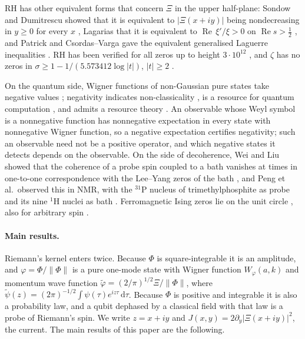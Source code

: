 \documentclass[11pt]{article}
\theoremstyle{definition}\newtheorem{definition}[theorem]{Definition}
\theoremstyle{remark}\newtheorem{remark}[theorem]{Remark}
\newcommand{\dd}{\,\mathrm d}\newcommand{\e}{\mathrm e}
\renewcommand{\Re}{\operatorname{Re}}\renewcommand{\Im}{\operatorname{Im}}
\begin{document}
RH has other equivalent forms that concern $\Xi$ in the upper half-plane: Sondow and Dumitrescu showed that it is equivalent to $|\Xi(x+iy)|$ being nondecreasing in $y\ge0$ for every $x$ \cite{SD}, Lagarias that it is equivalent to $\Re\,\xi'/\xi>0$ on $\Re s>\frac12$ \cite{Lagarias}, and Patrick and Csordas--Varga gave the equivalent generalised Laguerre inequalities \cite{Patrick,CV}. RH has been verified for all zeros up to height $3\cdot10^{12}$ \cite{PT}, and $\zeta$ has no zeros in $\sigma\ge1-1/(5.573412\log|t|)$, $|t|\ge2$ \cite{MT}.

On the quantum side, Wigner functions of non-Gaussian pure states take negative values \cite{Hudson}; negativity indicates non-classicality \cite{KZ}, is a resource for quantum computation \cite{ME}, and admits a resource theory \cite{Albarelli}. An observable whose Weyl symbol is a nonnegative function has nonnegative expectation in every state with nonnegative Wigner function, so a negative expectation certifies negativity; such an observable need not be a positive operator, and which negative states it detects depends on the observable. On the side of decoherence, Wei and Liu showed that the coherence of a probe spin coupled to a bath vanishes at times in one-to-one correspondence with the Lee--Yang zeros of the bath \cite{WeiLiu}, and Peng et al.\ observed this in NMR, with the $^{31}$P nucleus of trimethylphosphite as probe and its nine $^1$H nuclei as bath \cite{Peng}. Ferromagnetic Ising zeros lie on the unit circle \cite{LeeYang}, also for arbitrary spin \cite{Griffiths69}.

\paragraph{Main results.} Riemann's kernel enters twice. Because $\Phi$ is square-integrable it is an amplitude, and $\varphi=\Phi/\|\Phi\|$ is a pure one-mode state with Wigner function $W_\varphi(a,k)$ and momentum wave function $\tilde\varphi=(2/\pi)^{1/2}\Xi/\|\Phi\|$, where $\tilde\psi(z)=(2\pi)^{-1/2}\int\psi(\tau)e^{iz\tau}\dd\tau$. Because $\Phi$ is positive and integrable it is also a probability law, and a qubit dephased by a classical field with that law is a probe of Riemann's spin. We write $z=x+iy$ and $J(x,y)=2\partial_y|\Xi(x+iy)|^2$, the current. The main results of this paper are the following.
\end{document}
